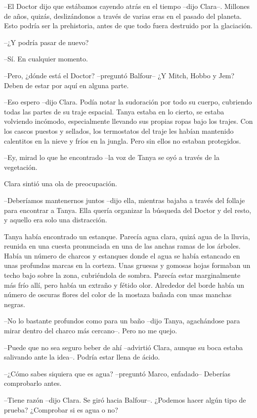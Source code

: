 {--El Doctor dijo que estábamos cayendo atrás en el tiempo --dijo
 Clara--. Millones de años, quizás, deslizándonos a través de varias eras
 en el pasado del planeta. Esto podría ser la prehistoria, antes de que
todo fuera destruido por la glaciación.}

{--¿Y podría pasar de nuevo?}

{--Sí. En cualquier momento.}

{--Pero, ¿dónde está el Doctor? --preguntó Balfour-- ¿Y Mitch, Hobbo y
Jem? Deben de estar por aquí en alguna parte.}

{--Eso espero --dijo Clara. Podía notar la sudoración por todo su cuerpo,
 cubriendo todas las partes de su traje espacial. Tanya estaba en lo
 cierto, se estaba volviendo incómodo, especialmente llevando sus propias
 ropas bajo los trajes. Con los cascos puestos y sellados, los
 termostatos del traje les habían mantenido calentitos en la nieve y
fríos en la jungla. Pero sin ellos no estaban protegidos.}

{--Ey, mirad lo que he encontrado --la voz de Tanya se oyó a través de la
vegetación.}

{Clara sintió una ola de preocupación.}

{--Deberíamos mantenernos juntos --dijo ella, mientras bajaba a través
 del follaje para encontrar a Tanya. Ella quería organizar la búsqueda
del Doctor y del resto, y aquello era solo una distracción.}

{Tanya había encontrado un estanque. Parecía agua clara, quizá agua de la
 lluvia, reunida en una cuesta pronunciada en una de las anchas ramas de
 los árboles. Había un número de charcos y estanques donde el agua se
 había estancado en unas profundas marcas en la corteza. Unas gruesas y
 gomosas hojas formaban un techo bajo sobre la zona, cubriéndola de
 sombra. Parecía estar marginalmente más frío allí, pero había un extraño
 y fétido olor. Alrededor del borde había un número de oscuras flores del
color de la mostaza bañada con unas manchas negras.}

{--No lo bastante profundos como para un baño --dijo Tanya, agachándose
para mirar dentro del charco más cercano--. Pero no me quejo.}

{--Puede que no sea seguro beber de ahí --advirtió Clara, aunque su boca
estaba salivando ante la idea--. Podría estar llena de ácido.}

{--¿Cómo sabes siquiera que es agua? --preguntó Marco, enfadado--
Deberías comprobarlo antes.}

{--Tiene razón --dijo Clara. Se giró hacia Balfour--. ¿Podemos hacer
algún tipo de prueba? ¿Comprobar si es agua o no?}

